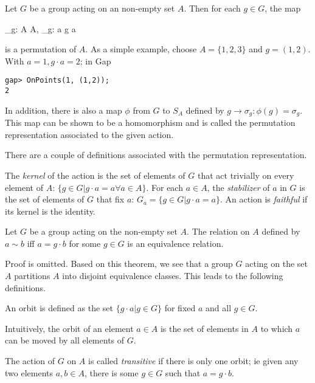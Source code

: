 
Let $G$ be a group acting on an non-empty set $A$. Then for each $g \in G$, the map

\bee
\sigma_g: A \rightarrow A, \quad \sigma_g: a \rightarrow g \cdot a
\eee

is a permutation of $A$. As a simple example, choose $A = \{1,2,3\}$ and $g = (1,2)$. With $a = 1, g \cdot a = 2$; in Gap

\begin{verbatim}
gap> OnPoints(1, (1,2));
2
\end{verbatim}

In addition, there is also a map $\phi$ from $G$ to $S_A$ defined by $g \rightarrow \sigma_g: \phi(g) = \sigma_g$. This map can be shown to be a homomorphism and is called the permutation representation associated to the given action.

There are a couple of definitions associated with the permutation representation.

\begin{definition}
The \emph{kernel} of the action is the set of elements of $G$ that act trivially on every element of $A$: $\{g \in G | g \cdot a = a \forall a \in A\}$. For each $a \in A$, the \emph{stabilizer} of $a$ in $G$ is the set of elements of $G$ that fix $a$: $G_a = \{g \in G | g \cdot a = a\}$. An action is \emph{faithful} if its kernel is the identity.
\end{definition}

\begin{theorem}
Let $G$ be a group acting on the non-empty set $A$. The relation on $A$ defined by $a \sim b$ iff $a = g \cdot b$ for some $g \in G$ is an equivalence relation.
\end{theorem}

Proof is omitted. Based on this theorem, we see that a group $G$ acting on the set $A$ partitions $A$ into disjoint equivalence classes. This leads to the following definitions.

\begin{definition}
An orbit is defined as the set $\{ g \cdot a | g \in G\}$ for fixed $a$ and all $g \in G$.
\end{definition}

Intuitively, the orbit of an element $a \in A$ is the set of elements in $A$ to which $a$ can be moved by all elements of $G$.

\begin{definition}
The action of $G$ on $A$ is called \emph{transitive} if there is only one orbit; ie given any two elements $a, b \in A$, there is some $g \in G$ such that $a = g \cdot b$.
\end{definition}

